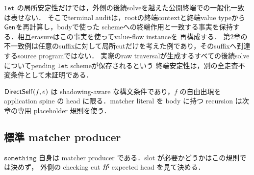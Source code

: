\begin{mathpar}

\end{mathpar}
$\mathtt{let}$ の局所安定性だけでは，外側の後続solveを越えた公開終端での一般化一致は表せない．
そこでterminal auditは，rootの終端contextと終端value typeから$\mathsf{Gen}$を再計算し，bodyで使った
schemeへの終端作用と一致する事実を保持する．相互erasureはこの事実を使ってvalue-flow instanceを
再構成する．
第2章の不一致例は任意のsuffixに対して局所cutだけを考えた例であり，そのsuffixへ到達するsource programではない．
実際のraw traversalが生成するすべての後続solveについてpending $\mathtt{let}$ schemeが保存されるという
終端安定性は，別の全走査不変条件として未証明である．

$\mathsf{DirectSelf}(f,e)$ は shadowing-aware な構文条件であり，$f$ の自由出現を application spine の
head に限る．matcher literal を body に持つ recursion は次章の専用 placeholder 規則を使う．

\subsection{標準 matcher producer}

\begin{mathpar}
\end{mathpar}
$\mathtt{something}$ 自身は matcher producer である．slot が必要かどうかはこの規則では決めず，
外側の checking cut が expected head を見て決める．
